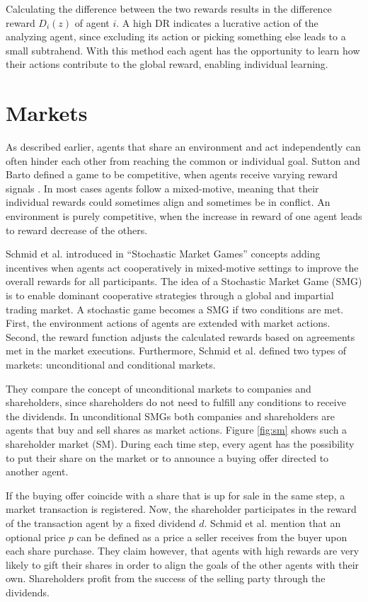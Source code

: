 Calculating the difference between the two rewards results in the difference reward $D_i(z)$ of agent $i$. A high DR indicates a lucrative action of the analyzing agent, since excluding its action or picking something else leads to a small subtrahend. With this method each agent has the opportunity to learn how their actions contribute to the global reward, enabling individual learning. 

\section{Markets}\label{market}
As described earlier, agents that share an environment and act independently can often hinder each other from reaching the common or individual goal. Sutton and Barto defined a game to be competitive, when agents receive varying reward signals \cite{suba18}. In most cases agents follow a mixed-motive, meaning that their individual rewards could sometimes align and sometimes be in conflict. An environment is purely competitive, when the increase in reward of one agent leads to reward decrease of the others.

Schmid et al. introduced in ``Stochastic Market Games'' \cite{scbe21} concepts adding incentives when agents act cooperatively in mixed-motive settings to improve the overall rewards for all participants. The idea of a Stochastic Market Game (SMG) is to enable dominant cooperative strategies through a global and impartial trading market. A stochastic game becomes a SMG if two conditions are met. First, the environment actions of agents are extended with market actions. Second, the reward function adjusts the calculated rewards based on agreements met in the market executions. Furthermore, Schmid et al. defined two types of markets: unconditional and conditional markets.

They compare the concept of unconditional markets to companies and shareholders, since shareholders do not need to fulfill any conditions to receive the dividends. In unconditional SMGs both companies and shareholders are agents that buy and sell shares as market actions. Figure \ref{fig:sm} shows such a shareholder market (SM). During each time step, every agent has the possibility to put their share on the market or to announce a buying offer directed to another agent.

If the buying offer coincide with a share that is up for sale in the same step, a market transaction is registered. Now, the shareholder participates in the reward of the transaction agent by a fixed dividend $d$. Schmid et al. mention that an optional price $p$ can be defined as a price a seller receives from the buyer upon each share purchase. They claim however, that agents with high rewards are very likely to gift their shares in order to align the goals of the other agents with their own. Shareholders profit from the success of the selling party through the dividends.

